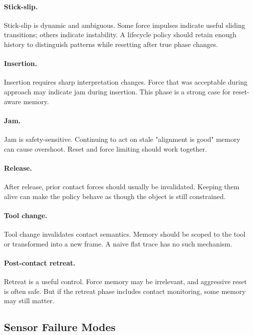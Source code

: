 \documentclass{article}
\begin{document}
\paragraph{Stick-slip.}
Stick-slip is dynamic and ambiguous. Some force impulses indicate useful
sliding transitions; others indicate instability. A lifecycle policy should
retain enough history to distinguish patterns while resetting after true phase
changes.

\paragraph{Insertion.}
Insertion requires sharp interpretation changes. Force that was acceptable
during approach may indicate jam during insertion. This phase is a strong case
for reset-aware memory.

\paragraph{Jam.}
Jam is safety-sensitive. Continuing to act on stale "alignment is good" memory
can cause overshoot. Reset and force limiting should work together.

\paragraph{Release.}
After release, prior contact forces should usually be invalidated. Keeping them
alive can make the policy behave as though the object is still constrained.

\paragraph{Tool change.}
Tool change invalidates contact semantics. Memory should be scoped to the tool
or transformed into a new frame. A naive flat trace has no such mechanism.

\paragraph{Post-contact retreat.}
Retreat is a useful control. Force memory may be irrelevant, and aggressive
reset is often safe. But if the retreat phase includes contact monitoring,
some memory may still matter.

\subsection{Sensor Failure Modes}
\end{document}
